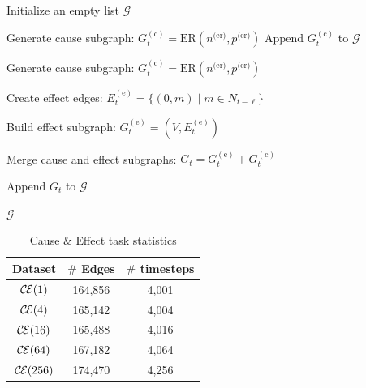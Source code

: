 {
\SetAlgoNoEnd
\begin{algorithm}[hbt!]
\caption{Cause \& Effect Task Generation}\label{alg:two}
\label{alg:cause_effect}


Initialize an empty list $\mathcal{G}$\;

 {
    Generate cause subgraph: $G^{(\text{c})}_t = \text{ER}(n^{\text{(er)}}, p^{\text{(er)}})$\;
    Append $G^{(\text{c})}_t$ to $\mathcal{G}$\;
}

 {
    Generate cause subgraph: $G^{(\text{c})}_t = \text{ER}(n^{\text{(er)}}, p^{\text{(er)}})$\;
    
    Create effect edges: $E^{(\text{e})}_t = \{(0, m) \mid m \in N_{t-\ell}\}$\;
    
    Build effect subgraph: $G^{(\text{e})}_t = (V, E^{(\text{e})}_t)$\;
    
    Merge cause and effect subgraphs: $G_t = G^{(\text{e})}_t + G^{(\text{c})}_t$\;
    
    Append $G_t$ to $\mathcal{G}$\;
}
\Return $\mathcal{G}$
\end{algorithm}
}

\begin{table}[h]
    \caption{Cause \& Effect task statistics}
    \centering
    \begin{tabular}{c|c|c}
        \toprule
        Dataset & $\#$ Edges & $\#$ timesteps \\
        \midrule
        $\causeeffect{1}$& 164,856 & 4,001 \\ 
        $\causeeffect{4}$& 165,142 & 4,004 \\ 
        $\causeeffect{16}$& 165,488 & 4,016 \\ 
        $\causeeffect{64}$& 167,182 & 4,064 \\ 
        $\causeeffect{256}$& 174,470 & 4,256 \\ 
    \end{tabular}
    \label{tab:cause_and_effect_stats}
\end{table}

